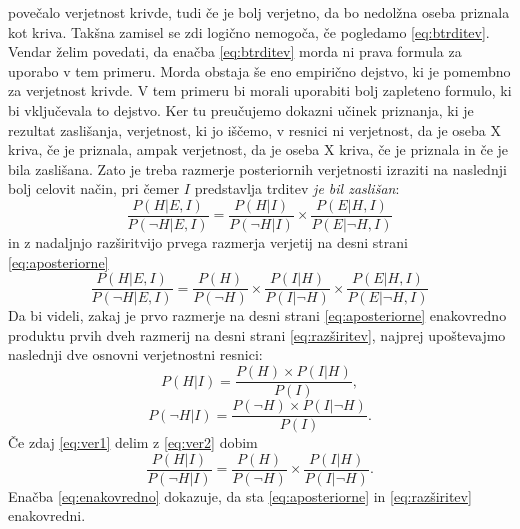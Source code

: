\documentclass[fin1, tisk]{fmfdelo}
\theoremstyle{definition}
\theoremstyle{trditev}
\theoremstyle{izrek}
\begin{document}
povečalo verjetnost krivde, tudi če je bolj verjetno, da bo nedolžna oseba priznala kot kriva. Takšna zamisel se zdi logično nemogoča, če 
pogledamo \eqref{eq:btrditev}. Vendar želim povedati, da enačba \eqref{eq:btrditev} morda ni prava formula za uporabo v tem primeru. Morda obstaja še eno empirično dejstvo, 
ki je pomembno za verjetnost krivde. V tem primeru bi morali uporabiti bolj zapleteno formulo, ki bi vključevala to dejstvo. Ker tu preučujemo 
dokazni učinek priznanja, ki je rezultat zaslišanja, verjetnost, ki jo iščemo, v resnici ni verjetnost, da je oseba X kriva, če je priznala, 
ampak verjetnost, da je oseba X kriva, če je priznala in če je bila zaslišana. Zato je treba razmerje posteriornih verjetnosti izraziti na 
naslednji bolj celovit način, pri čemer $I$ predstavlja trditev \textit{je bil zaslišan}:
\begin{equation}\label{eq:aposteriorne}
    \frac{P(H \lvert E, I)}{P(\neg H \lvert E, I)} = \frac{P(H \lvert I)}{P(\neg H \lvert I)}  \times \frac{P(E \lvert H, I)}{P(E \lvert \neg H, I)}
\end{equation}
in z nadaljnjo razširitvijo prvega razmerja verjetij na desni strani \eqref{eq:aposteriorne}
\begin{equation}\label{eq:razširitev}
    \frac{P(H \lvert E, I)}{P(\neg H \lvert E, I)} = \frac{P(H)}{P(\neg H)} \times \frac{P(I \lvert H)}{P(I \lvert \neg H)}  \times \frac{P(E \lvert H, I)}{P(E \lvert \neg H, I)}
\end{equation}
Da bi videli, zakaj je prvo razmerje na desni strani \eqref{eq:aposteriorne} enakovredno produktu prvih dveh razmerij na desni strani \eqref{eq:razširitev}, najprej upoštevajmo naslednji dve osnovni verjetnostni resnici:
\begin{equation}\label{eq:ver1}
    P(H \lvert I) = \frac{P(H) \times P(I \lvert H)}{P(I)},
\end{equation}
\begin{equation}\label{eq:ver2}
    P(\neg H \lvert I) = \frac{P(\neg H) \times P(I \lvert \neg H)}{P(I)}.
\end{equation}
Če zdaj \eqref{eq:ver1} delim z \eqref{eq:ver2} dobim
\begin{equation}\label{eq:enakovredno}
    \frac{P(H \lvert I)}{P(\neg H \lvert I)} = \frac{P(H)}{P(\neg H)}  \times \frac{P(I \lvert H)}{P(I \lvert \neg H)}.
\end{equation}
Enačba \eqref{eq:enakovredno} dokazuje, da sta \eqref{eq:aposteriorne} in \eqref{eq:razširitev} enakovredni.\\\\
\end{document}
